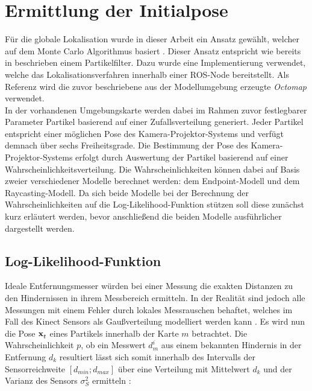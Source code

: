 \section{Ermittlung der Initialpose}
\label{chap.globloc}
Für die globale Lokalisation wurde in dieser Arbeit ein Ansatz gewählt, welcher auf dem Monte Carlo Algorithmus basiert \cite{Dellaert1999}. Dieser Ansatz entspricht wie bereits in  beschrieben einem Partikelfilter. Dazu wurde eine Implementierung \cite{humanoidNavigation} verwendet, welche das Lokalisationsverfahren innerhalb einer ROS-Node bereitstellt. Als Referenz wird die zuvor beschriebene aus der Modellumgebung erzeugte \textit{Octomap} verwendet. \\
In der vorhandenen Umgebungskarte werden dabei im Rahmen zuvor festlegbarer Parameter Partikel basierend auf einer Zufallsverteilung generiert. Jeder Partikel entspricht einer möglichen Pose des Kamera-Projektor-Systems und verfügt demnach über sechs Freiheitsgrade. Die Bestimmung der Pose des Kamera-Projektor-Systems erfolgt durch Auswertung der Partikel basierend auf einer Wahrscheinlichkeitsverteilung. Die Wahrscheinlichkeiten können dabei auf Basis zweier verschiedener Modelle berechnet werden: dem Endpoint-Modell und dem Raycasting-Modell. Da sich beide Modelle bei der Berechnung der Wahrscheinlichkeiten auf die Log-Likelihood-Funktion stützen soll diese zunächst kurz erläutert werden, bevor anschließend die beiden Modelle ausführlicher dargestellt werden.

\subsection{Log-Likelihood-Funktion}
\label{chap.loglik}
Ideale Entfernungsmesser würden bei einer Messung die exakten Distanzen zu den Hindernissen in ihrem Messbereich ermitteln. In der Realität sind jedoch alle Messungen mit einem Fehler durch lokales Messrauschen behaftet, welches im Fall des Kinect Sensors als Gaußverteilung modelliert werden kann \cite{Nguyen2012}. Es wird nun die Pose $\mathbf{x}^{}_{t}$ eines Partikels innerhalb der Karte $m$ betrachtet. Die Wahrscheinlichkeit $p$, ob ein Messwert $d_m^i$ aus einem bekannten Hindernis in der Entfernung $d_k$ resultiert lässt sich somit innerhalb des Intervalls der Sensorreichweite $[d_{min};d_{max}]$ über eine Verteilung mit Mittelwert $d_k$ und der Varianz des Sensors $\sigma_{S}^2$ ermitteln \cite{Thrun2005}:


